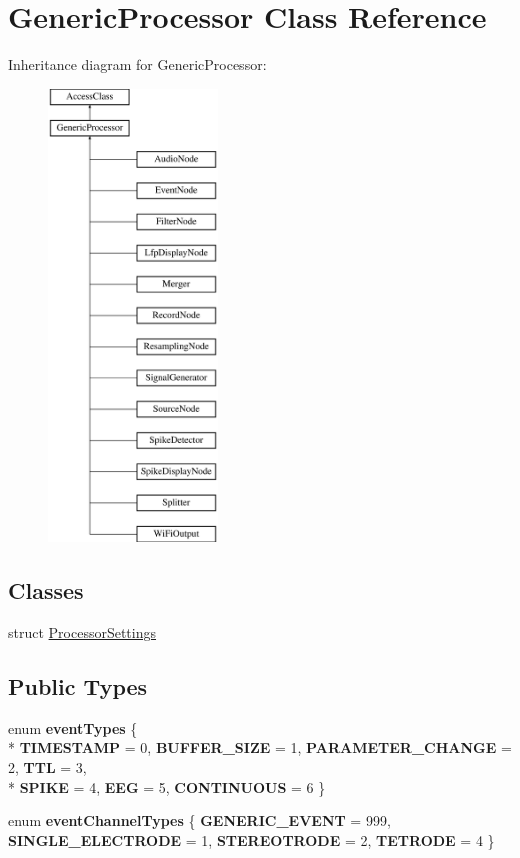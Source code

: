 \hypertarget{classGenericProcessor}{\section{Generic\-Processor Class Reference}
\label{classGenericProcessor}
}
Inheritance diagram for Generic\-Processor\-:\begin{figure}[H]
\begin{center}
\leavevmode
\includegraphics[height=12.000000cm]{classGenericProcessor}
\end{center}
\end{figure}
\subsection*{Classes}
\begin{DoxyCompactItemize}
\item 
struct \hyperlink{structGenericProcessor_1_1ProcessorSettings}{Processor\-Settings}
\end{DoxyCompactItemize}
\subsection*{Public Types}
\begin{DoxyCompactItemize}
\item 
enum {\bfseries event\-Types} \{ \\*
{\bfseries T\-I\-M\-E\-S\-T\-A\-M\-P} =  0, 
{\bfseries B\-U\-F\-F\-E\-R\-\_\-\-S\-I\-Z\-E} =  1, 
{\bfseries P\-A\-R\-A\-M\-E\-T\-E\-R\-\_\-\-C\-H\-A\-N\-G\-E} =  2, 
{\bfseries T\-T\-L} =  3, 
\\*
{\bfseries S\-P\-I\-K\-E} =  4, 
{\bfseries E\-E\-G} =  5, 
{\bfseries C\-O\-N\-T\-I\-N\-U\-O\-U\-S} =  6
 \}
\item 
enum {\bfseries event\-Channel\-Types} \{ {\bfseries G\-E\-N\-E\-R\-I\-C\-\_\-\-E\-V\-E\-N\-T} =  999, 
{\bfseries S\-I\-N\-G\-L\-E\-\_\-\-E\-L\-E\-C\-T\-R\-O\-D\-E} =  1, 
{\bfseries S\-T\-E\-R\-E\-O\-T\-R\-O\-D\-E} =  2, 
{\bfseries T\-E\-T\-R\-O\-D\-E} =  4
 \}
\end{DoxyCompactItemize}
